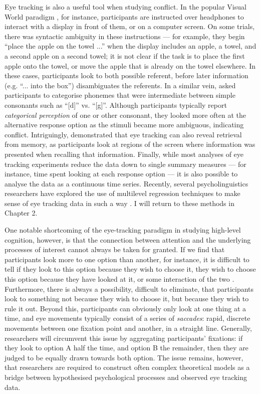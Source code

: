 Eye tracking is also a useful tool when studying conflict.
In the popular Visual World paradigm
\citep{Huettig2011,Allopenna1998,Tanenhaus1995},
for instance, participants are instructed over headphones
to interact with a display in front of them, or on a computer screen.
On some trials, there was syntactic ambiguity in these instructions ---
for example, they begin ``place the apple on the towel ...''
when the display includes an apple, a towel, and a second apple on a second towel;
it is not clear if the task is to place the first apple onto the towel,
or move the apple that is already on the towel elsewhere.
In these cases, participants look to both possible referent,
before later information (e.g. ``... into the box'') disambiguates the referents.
In a similar vein, \citet{McMurray2008} asked participants to 
categorise phonemes that were intermediate between
simple consonants such as ``[d]'' vs. ``[g]''.
Although participants typically report
\emph{categorical perception} of one or other consonant,
they looked more often at the alternative response option
as the stimuli became more ambiguous, indicating conflict. 
Intriguingly, \citet{Richardson2000} demonstrated
that eye tracking can also reveal retrieval from memory,
as participants look at regions of the screen
where information was presented when recalling that information.
Finally, while most analyses of eye tracking experiments
reduce the data down to single summary measures  ---
for instance, time spent looking at each response option ---
it is also possible to analyse the data as a continuous time series.
Recently, several psycholinguistics researchers have explored
the use of multilevel regression techniques
to make sense of eye tracking data in such a way
\citep[e.g.][]{Barr2008,Mirman2014a,Mirman2008}.
I will return to these methods in Chapter 2.

One notable shortcoming of the eye-tracking paradigm
in studying high-level cognition, however,
is that the connection between attention
and the underlying processes of interest cannot always be taken for granted.
If we find that participants look more to one option than another,
for instance, it is difficult to tell if
they look to this option because they wish to choose it,
they wish to choose this option because they have looked at it,
or some interaction of the two \citep[see][]{Krajbich2011}.
Furthermore, there is always a possibility, difficult to eliminate,
that participants look to something not because they wish to choose it,
but because they wish to rule it out.
Beyond this, participants can obviously only look at one thing at a time,
and eye movements typically consist of 
a series of \emph{saccades}: rapid, discrete movements
between one fixation point and another, in a straight line.
Generally, researchers will circumvent this issue
by aggregating participants' fixations:
if they look to option A half the time, and  option B the remainder,
then they are judged to be equally drawn towards both option.
The issue remains, however, that researchers are required to
construct often complex theoretical models
as a bridge between hypothesised psychological processes
and observed eye tracking data.

